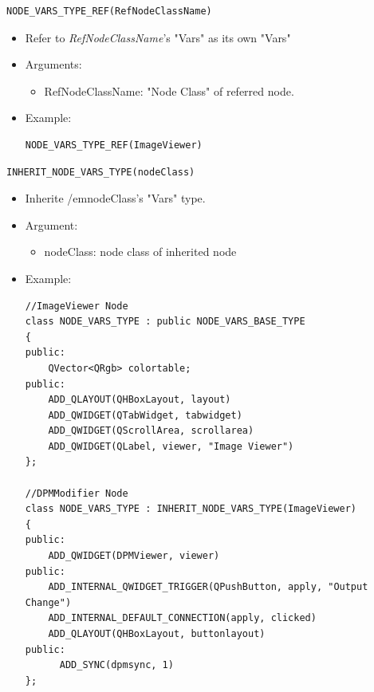 \documentclass[a4paper,10pt]{book}
\begin{document}
\begin{mdframed}
\begin{verbatim}
NODE_VARS_TYPE_REF(RefNodeClassName)
\end{verbatim}
\begin{itemize}
 \item Refer to {\em{RefNodeClassName}}'s "Vars" as its own "Vars"
 \item Arguments:
 \begin{itemize}
  \item RefNodeClassName: "Node Class" of referred node.
 \end{itemize}
 \item Example:
 \begin{verbatim}
NODE_VARS_TYPE_REF(ImageViewer)
 \end{verbatim}
\end{itemize}
\end{mdframed}

\begin{mdframed}
\begin{verbatim}
INHERIT_NODE_VARS_TYPE(nodeClass)
\end{verbatim}
\begin{itemize}
 \item Inherite {/em{nodeClass}}'s "Vars" type.
 \item Argument:
 \begin{itemize}
  \item nodeClass: node class of inherited node
 \end{itemize}
 \item Example:
 \begin{verbatim}
//ImageViewer Node
class NODE_VARS_TYPE : public NODE_VARS_BASE_TYPE
{
public:
    QVector<QRgb> colortable;
public:
    ADD_QLAYOUT(QHBoxLayout, layout)
    ADD_QWIDGET(QTabWidget, tabwidget)
    ADD_QWIDGET(QScrollArea, scrollarea)
    ADD_QWIDGET(QLabel, viewer, "Image Viewer")
};

//DPMModifier Node
class NODE_VARS_TYPE : INHERIT_NODE_VARS_TYPE(ImageViewer)
{
public:
    ADD_QWIDGET(DPMViewer, viewer)
public:
    ADD_INTERNAL_QWIDGET_TRIGGER(QPushButton, apply, "Output Change")
    ADD_INTERNAL_DEFAULT_CONNECTION(apply, clicked)
    ADD_QLAYOUT(QHBoxLayout, buttonlayout)
public:
      ADD_SYNC(dpmsync, 1)
};
 \end{verbatim}
\end{itemize}
\end{mdframed}
\end{document}
